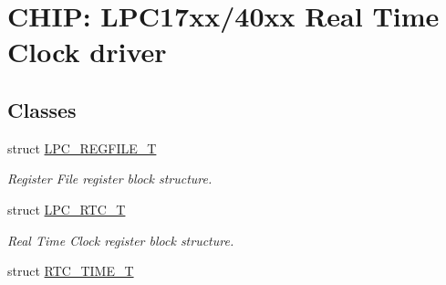 \hypertarget{group__RTC__17XX__40XX}{}\section{C\+H\+IP\+: L\+P\+C17xx/40xx Real Time Clock driver}
\label{group__RTC__17XX__40XX}
\subsection*{Classes}
\begin{DoxyCompactItemize}
\item 
struct \hyperlink{structLPC__REGFILE__T}{L\+P\+C\+\_\+\+R\+E\+G\+F\+I\+L\+E\+\_\+T}
\begin{DoxyCompactList}\small\item\em Register File register block structure. \end{DoxyCompactList}\item 
struct \hyperlink{structLPC__RTC__T}{L\+P\+C\+\_\+\+R\+T\+C\+\_\+T}
\begin{DoxyCompactList}\small\item\em Real Time Clock register block structure. \end{DoxyCompactList}\item 
struct \hyperlink{structRTC__TIME__T}{R\+T\+C\+\_\+\+T\+I\+M\+E\+\_\+T}
\end{DoxyCompactItemize}
